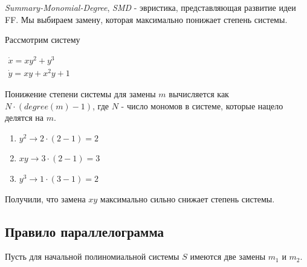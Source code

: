 \begin{heuristics} \label{heur:AEQD}
    \textit{Summary-Monomial-Degree}, \textit{SMD} - эвристика, представляющая развитие идеи FF. Мы выбираем замену, которая максимально понижает степень системы.
    
    \begin{example}
        Рассмотрим систему
        
        $\begin{array}{lcl}
             \dot x = xy^2 + y^3 \\
             \dot y = xy + x^2 y + 1
        \end{array}$
        \newline
        
        Понижение степени системы для замены $m$ вычисляется как $N \cdot (degree(m) - 1)$, где $N$ - число мономов в системе, которые нацело делятся на $m$.
        \begin{enumerate}
            \item $y^2 \longrightarrow 2 \cdot (2 - 1) = 2$
            \item $xy \longrightarrow 3 \cdot (2 - 1) = 3$
            \item $y^3 \longrightarrow 1 \cdot (3 - 1) = 2$
        \end{enumerate}
        Получили, что замена $xy$ максимально сильно снижает степень системы.
    \end{example}
\end{heuristics}

\subsection{Правило параллелограмма} \label{sec:parallel-rule}

Пусть для начальной полиномиальной системы $S$ имеются две замены $m_1$ и $m_2$.

